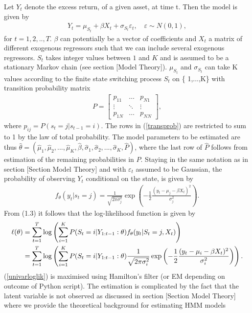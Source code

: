 \documentclass[11pt,a4paper,oneside]{article}
\newcommand{\lp}{\left(}
\newcommand{\rp}{\right)}
\begin{document}
Let $Y_t$ denote the excess return, of a given asset, at time t. Then the model is given by    
\begin{align}
    Y_t=\mu_{S_t}+\beta X_t+\sigma_{S_t}\varepsilon_t, \quad \varepsilon \sim N(0,1) \label{univarmodel}, 
\end{align}
for $t=1,2,..,T$. $\beta$ can potentially be a vector of coefficients and $X_t$ a matrix of different exogenous regressors such that we can include several exogenous regressors. $S_t$ takes integer values between $1$ and $K$ and is assumed to be a stationary Markov chain (see section [Model Theory]). $\mu_{S_t}$ and $\sigma_{S_t}$ can take K values according to the finite state switching process $S_t$ on \{ 1,...,K\} with transition probability matrix  
\vspace{-7mm}
\begin{align}\label{transprob}
 P=\begin{bmatrix}
    p_{11} &  \dots  & p_{N1} \\
    \vdots &  \ddots & \vdots \\
    p_{1N} &  \dots  & p_{NN} 
\end{bmatrix},
\end{align}
where $p_{ij}=P(s_t=j \vert s_{t-1}=i)$. The rows in (\ref{transprob}) are restricted to sum to 1 by the law of total probability. The model parameters to be estimated are thus $\hat{\theta}=(\hat{\mu}_1,\hat{\mu}_2,...,\hat{\mu}_K,\hat{\beta},\hat{\sigma}_1,\hat{\sigma}_2,...,\hat{\sigma}_K,\hat{P})$, where the last row of $\hat{P}$ follows from estimation of the remaining probabilities in $P$. Staying in the same notation as in section [Section Model Theory]  and with $\varepsilon_t$ assumed to be Gaussian, the  probability of observing $Y_t$ conditional on the state, is given by
\begin{align}
    f_\theta(y_t\vert s_t=j)=\frac{1}{\sqrt{2\pi\sigma_j^2}}\exp{\lp-\frac{1}{2} \frac{(y_t-\mu_j-\beta X_t)^2}{\sigma_j^2}\rp}\label{univargauss}.
\end{align}
From (1.3) it follows that the log-likelihood function is given by
\begin{align}\label{univarloglik}
    \ell(\theta)&=\sum_{t=1}^T \log \lp \sum_{i=1}^K  P(S_t=i \vert Y_{1:t-1} : \theta) f_\theta(y_t\vert S_t=j,X_t) \rp \notag \\
    &=\sum_{t=1}^T \log \lp \sum_{i=1}^K  P(S_t=i \vert Y_{1:t-1} : \theta) \frac{1}{\sqrt{2\pi\sigma_i^2}}\exp{\lp-\frac{1}{2} \frac{(y_t-\mu_i-\beta X_t)^2}{\sigma_i^2}\rp} \rp.
\end{align}
(\ref{univarloglik}) is maximised using Hamilton's filter (or EM depending on outcome of Python script). The estimation is complicated by the fact that the latent variable is not observed as discussed in section [Section Model Theory] where we provide the theoretical background for estimating HMM models
\end{document}
